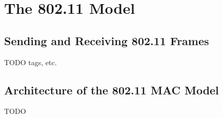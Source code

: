 \chapter{The 802.11 Model}
\label{cha:80211}


\section{Sending and Receiving 802.11 Frames}

TODO tags, etc.

\section{Architecture of the 802.11 MAC Model}

TODO


